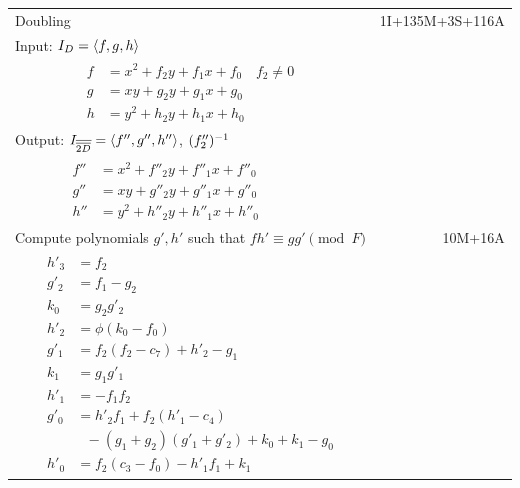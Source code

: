 \pagebreak
\begin{tabularx}{\linewidth}{|Xr|}
  \hline
  Doubling & 1I+135M+3S+116A \\
  Input: $I_D = \left\langle f, g, h \right\rangle$ & \\
  {\begin{align*}
  f &= x^2 + f_2y + f_1x + f_0 & f_2 \neq 0 \\
  g &=  xy + g_2y + g_1x + g_0 \\
  h &= y^2 + h_2y + h_1x + h_0
  \end{align*}} & \\
  Output: $I_{\overline{\overline{2D}}} = \left\langle f'', g'', h'' \right\rangle$, $(f''_2)^{-1}$ & \\
  {\begin{align*}
  f'' &= x^2 + f''_2y + f''_1x + f''_0 & \phantom{f_2 \neq 0} \\
  g'' &=  xy + g''_2y + g''_1x + g''_0 \\
  h'' &= y^2 + h''_2y + h''_1x + h''_0
  \end{align*}} & \\
  \hline
  Compute polynomials $g',h'$ such that $fh' \equiv gg' \pmod F$ & 10M+16A \\
  \hline
  {\begin{align*}
    h'_3 &= f_2 \\
    g'_2 &= f_1 - g_2 \\
    k_0  &= g_2g'_2 \\
    h'_2 &= \phi(k_0 - f_0) \\ 
    g'_1 &= f_2(f_2 - c_7) + h'_2 - g_1 \\
    k_1  &= g_1g'_1 \\
    h'_1 &= -f_1f_2 \\
    g'_0 &= h'_2f_1 + f_2(h'_1 - c_4) \\
         & ~~~ - (g_1 + g_2)(g'_1 + g'_2) + k_0 + k_1 - g_0 \\
    h'_0 &= f_2(c_3 - f_0) - h'_1f_1 + k_1
  \end{align*}} & \\
  \hline
\end{tabularx}

